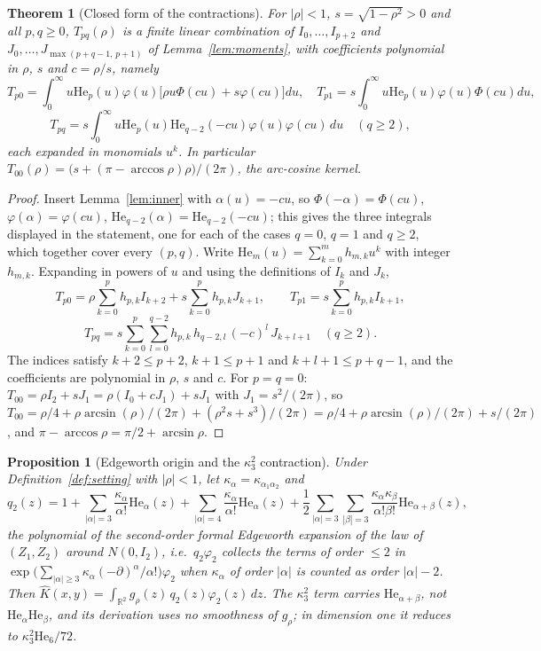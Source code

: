 \documentclass[11pt]{article}
\newtheorem{theorem}{Theorem}
\newtheorem{proposition}{Proposition}
\theoremstyle{definition}
\newcommand{\R}{\mathbb{R}}
\newcommand{\He}{\mathrm{He}}
\begin{document}
\begin{theorem}[Closed form of the contractions]\label{thm:closed}
For $|\rho|<1$, $s=\sqrt{1-\rho^2}>0$ and all $p,q\ge0$, $T_{pq}(\rho)$ is a finite
linear combination of $I_0,\dots,I_{p+2}$ and $J_0,\dots,J_{\max(p+q-1,\,p+1)}$ of
Lemma~\ref{lem:moments}, with coefficients polynomial in $\rho$, $s$ and $c=\rho/s$, namely
\[
T_{p0}=\int_0^\infty u\He_p(u)\varphi(u)\big[\rho u\Phi(cu)+s\varphi(cu)\big]du,\quad
T_{p1}=s\int_0^\infty u\He_p(u)\varphi(u)\Phi(cu)du,
\]
\[
T_{pq}=s\int_0^\infty u\He_p(u)\He_{q-2}(-cu)\varphi(u)\varphi(cu)\,du\quad(q\ge2),
\]
each expanded in monomials $u^k$. In particular
$T_{00}(\rho)=\big(s+(\pi-\arccos\rho)\rho\big)/(2\pi)$, the arc-cosine kernel.
\end{theorem}

\begin{proof}
Insert Lemma~\ref{lem:inner} with $\alpha(u)=-cu$, so $\Phi(-\alpha)=\Phi(cu)$,
$\varphi(\alpha)=\varphi(cu)$, $\He_{q-2}(\alpha)=\He_{q-2}(-cu)$; this gives the three
integrals displayed in the statement, one for each of the cases $q=0$, $q=1$ and $q\ge2$,
which together cover every $(p,q)$. Write $\He_m(u)=\sum_{k=0}^m h_{m,k}u^k$ with integer
$h_{m,k}$. Expanding in powers of $u$ and using the definitions of $I_k$ and $J_k$,
\[
T_{p0}=\rho\sum_{k=0}^p h_{p,k}I_{k+2}+s\sum_{k=0}^p h_{p,k}J_{k+1},\qquad
T_{p1}=s\sum_{k=0}^p h_{p,k}I_{k+1},
\]
\[
T_{pq}=s\sum_{k=0}^p\sum_{l=0}^{q-2}h_{p,k}\,h_{q-2,l}\,(-c)^l\,J_{k+l+1}\quad(q\ge2).
\]
The indices satisfy $k+2\le p+2$, $k+1\le p+1$ and $k+l+1\le p+q-1$, and the coefficients
are polynomial in $\rho$, $s$ and $c$. For $p=q=0$:
$T_{00}=\rho I_2+sJ_1=\rho(I_0+cJ_1)+sJ_1$ with $J_1=s^2/(2\pi)$, so
$T_{00}=\rho/4+\rho\arcsin(\rho)/(2\pi)+(\rho^2s+s^3)/(2\pi)
=\rho/4+\rho\arcsin(\rho)/(2\pi)+s/(2\pi)$, and $\pi-\arccos\rho=\pi/2+\arcsin\rho$.
\end{proof}

\begin{proposition}[Edgeworth origin and the $\kappa_3^2$ contraction]\label{prop:edgeworth}
Under Definition~\ref{def:setting} with $|\rho|<1$, let
$\kappa_\alpha=\kappa_{\alpha_1\alpha_2}$ and
\[
q_2(z)=1+\sum_{|\alpha|=3}\frac{\kappa_\alpha}{\alpha!}\He_\alpha(z)
+\sum_{|\alpha|=4}\frac{\kappa_\alpha}{\alpha!}\He_\alpha(z)
+\frac12\sum_{|\alpha|=3}\sum_{|\beta|=3}\frac{\kappa_\alpha\kappa_\beta}{\alpha!\beta!}\He_{\alpha+\beta}(z),
\]
the polynomial of the second-order formal Edgeworth expansion of the law of $(Z_1,Z_2)$
around $N(0,I_2)$, i.e.\ $q_2\varphi_2$ collects the terms of order $\le2$ in
$\exp\!\big(\sum_{|\alpha|\ge3}\kappa_\alpha(-\partial)^\alpha/\alpha!\big)\varphi_2$ when
$\kappa_\alpha$ of order $|\alpha|$ is counted as order $|\alpha|-2$. Then
$\widehat K(x,y)=\int_{\R^2}g_\rho(z)\,q_2(z)\varphi_2(z)\,dz$. The $\kappa_3^2$ term
carries $\He_{\alpha+\beta}$, not $\He_\alpha\He_\beta$, and its derivation uses no
smoothness of $g_\rho$; in dimension one it reduces to $\kappa_3^2\He_6/72$.
\end{proposition}
\end{document}
